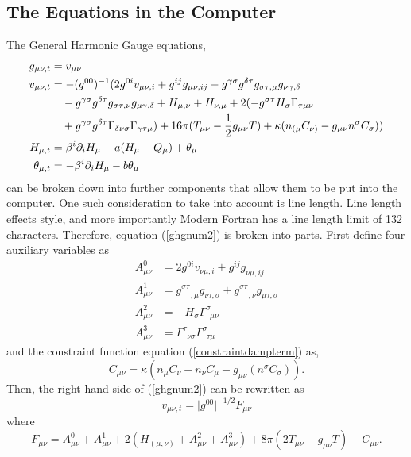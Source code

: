 \documentclass[11pt]{article}
\newcommand{\blank}{\enspace}
\newcommand{\blankt}{\text{ }}
\numberwithin{equation}{section}
\begin{document}
\subsection{The Equations in the Computer}
The General Harmonic Gauge equations, 
\begin{align}
    g_{\mu\nu,t} &= v_{\mu\nu} \label{ghgnum1}\\ 
    v_{\mu\nu,t} &= -(g^{00})^{-1}(2g^{0i}v_{\mu\nu,i} + g^{ij}g_{\mu\nu,ij} -  g^{\gamma\sigma}g^{\delta\tau}g_{\sigma\tau,\mu}g_{\nu\gamma,\delta} \notag \\
    & \quad - g^{\gamma\sigma}g^{\delta\tau}g_{\sigma\tau,\nu}g_{\mu\gamma,\delta} + H_{\mu,\nu} + H_{\nu,\mu} + 2(-g^{\sigma\tau}H_{\sigma}\Gamma_{\tau\mu\nu} \notag \\
    &\quad + g^{\gamma\sigma}g^{\delta\tau}\Gamma_{\delta\nu\sigma}\Gamma_{\gamma\tau\mu}) + 16\pi(T_{\mu\nu} - \frac12g_{\mu\nu}T) + \kappa ( n_{(\mu}C_{\nu)} - g_{\mu\nu}n^{\sigma}C_{\sigma}) ) \label{ghgnum2} \\ 
    H_{\mu,t} &= \beta^i\partial_iH_\mu  - a(H_\mu - Q_\mu) + \theta_{\mu} \label{ghgnum3} \\
    \theta_{\mu,t} &= -\beta^i\partial_iH_{\mu} - b\theta_\mu \label{ghgnum4}
\end{align}
can be broken down into further components that allow them to be put into the computer. One such consideration to take into account is line length. Line length effects style, and more importantly Modern Fortran has a line length limit of 132 characters. Therefore, equation (\ref{ghgnum2}) is broken into parts. First define four auxiliary variables as
\begin{align}
    A^0_{\mu\nu} &= 2g^{0i}v_{\nu\mu,i} + g^{ij}g_{\nu\mu,ij} \label{A0}\\
    A^1_{\mu\nu} &= g^{\sigma\tau}_{\blank\blankt,\mu}g_{\nu\tau,\sigma} + g^{\sigma\tau}_{\blank\blankt,\nu}g_{\mu\tau,\sigma} \label{A1} \\
    A^2_{\mu\nu} &= -H_{\sigma}\Gamma^{\sigma}_{\blank\mu\nu} \label{A2} \\
    A^3_{\mu\nu} &= \Gamma^{\tau}_{\blank\nu\sigma}\Gamma^{\sigma}_{\blank\tau\mu} \label{A3}
\end{align}
and the constraint function equation (\ref{constraintdampterm}) as, 
\begin{equation}
    C_{\mu\nu} = \kappa(n_{\mu}C_{\nu} + n_{\nu}C_{\mu} - g_{\mu\nu}(n^{\sigma}C_{\sigma})).
\end{equation}
Then, the right hand side of (\ref{ghgnum2}) can be rewritten as
\begin{equation}
    v_{\mu\nu,t} = \rvert g^{00} \rvert^{-1/2} F_{\mu\nu}
\end{equation}
where 
\begin{equation}\label{fmunu}
    F_{\mu\nu} = A^0_{\mu\nu} + A^1_{\mu\nu} + 2(H_{(\mu,\nu)} + A^2_{\mu\nu} + A^3_{\mu\nu}) + 8\pi(2T_{\mu\nu} - g_{\mu\nu}T) + C_{\mu\nu}.
\end{equation}
\end{document}
